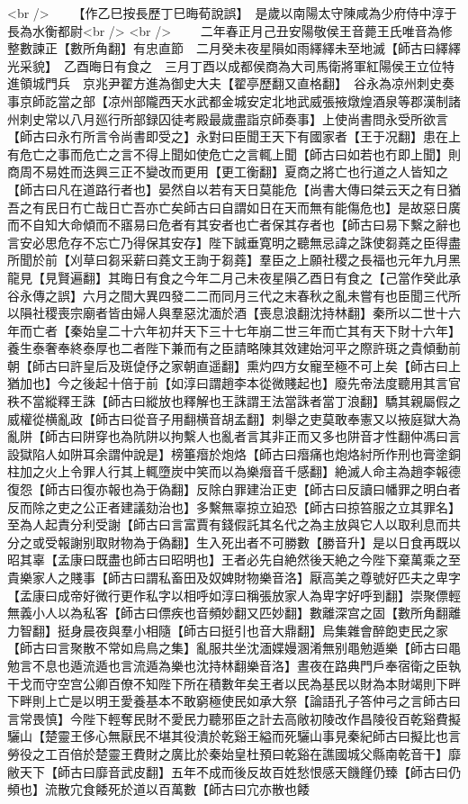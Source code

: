 <br />
　　【作乙巳按長歷丁巳晦荀說誤】　是歲以南陽太守陳咸為少府侍中淳于長為水衡都尉<br />
<br />
　　二年春正月己丑安陽敬侯王音薨王氏唯音為修整數諫正【數所角翻】有忠直節　二月癸未夜星隕如雨繹繹未至地滅【師古曰繹繹光采貌】　乙酉晦日有食之　三月丁酉以成都侯商為大司馬衛將軍紅陽侯王立位特進領城門兵　京兆尹翟方進為御史大夫【翟亭歷翻又直格翻】　谷永為凉州刺史奏事京師訖當之部【凉州部隴西天水武都金城安定北地武威張掖燉煌酒泉等郡漢制諸州刺史常以八月廵行所部録囚徒考殿最歲盡詣京師奏事】上使尚書問永受所欲言【師古曰永冇所言令尚書即受之】永對曰臣聞王天下有國家者【王于况翻】患在上有危亡之事而危亡之言不得上聞如使危亡之言輒上聞【師古曰如若也冇即上聞】則商周不易姓而迭興三正不變改而更用【更工衡翻】夏商之將亡也行道之人皆知之【師古曰凡在道路行者也】晏然自以若有天日莫能危【尚書大傳曰桀云天之有日猶吾之有民日冇亡哉日亡吾亦亡矣師古曰自謂如日在天而無有能傷危也】是故惡日廣而不自知大命傾而不寤易曰危者有其安者也亡者保其存者也【師古曰易下繫之辭也言安必思危存不忘亡乃得保其安存】陛下誠垂寛明之聽無忌諱之誅使芻蕘之臣得盡所聞於前【刈草曰芻采薪曰蕘文王詢于芻蕘】羣臣之上願社稷之長福也元年九月黑龍見【見賢遍翻】其晦日有食之今年二月己未夜星隕乙酉日有食之【己當作癸此承谷永傳之誤】六月之間大異四發二二而同月三代之末春秋之亂未嘗有也臣聞三代所以隕社稷喪宗廟者皆由婦人與羣惡沈湎於酒【喪息浪翻沈持林翻】秦所以二世十六年而亡者【秦始皇二十六年初幷天下三十七年崩二世三年而亡其有天下財十六年】養生泰奢奉終泰厚也二者陛下兼而有之臣請略陳其效建始河平之際許斑之貴傾動前朝【師古曰許皇后及斑偼伃之家朝直遥翻】熏灼四方女寵至極不可上矣【師古曰上猶加也】今之後起十倍于前【如淳曰謂趙李本從微賤起也】廢先帝法度聽用其言官秩不當縱釋王誅【師古曰縱放也釋解也王誅謂王法當誅者當丁浪翻】驕其親屬假之威權從横亂政【師古曰從音子用翻横音胡孟翻】刺舉之吏莫敢奉憲又以掖庭獄大為亂阱【師古曰阱穿也為阬阱以拘繫人也亂者言其非正而又多也阱音才性翻仲馮曰言設獄陷人如阱耳余謂仲說是】榜箠㿊於炮烙【師古曰㿊痛也炮烙紂所作刑也膏塗銅柱加之火上令罪人行其上輒墮炭中笑而以為樂㿊音千感翻】絶滅人命主為趙李報德復怨【師古曰復亦報也為于偽翻】反除白罪建治正吏【師古曰反讀曰幡罪之明白者反而除之吏之公正者建議劾治也】多繫無辜掠立廹恐【師古曰掠笞服之立其罪名】至為人起責分利受謝【師古曰言富賈有錢假託其名代之為主放與它人以取利息而共分之或受報謝别取財物為于偽翻】生入死出者不可勝數【勝音升】是以日食再既以昭其辜【孟康曰既盡也師古曰昭明也】王者必先自絶然後天絶之今陛下棄萬乘之至貴樂家人之賤事【師古曰謂私畜田及奴婢財物樂音洛】厭高美之尊號好匹夫之卑字【孟康曰成帝好微行更作私字以相呼如淳曰稱張放家人為卑字好呼到翻】崇聚僄輕無義小人以為私客【師古曰僄疾也音頻妙翻又匹妙翻】數離深宫之固【數所角翻離力智翻】挺身晨夜與羣小相隨【師古曰挺引也音大鼎翻】烏集雜會醉飽吏民之家【師古曰言聚散不常如烏鳥之集】亂服共坐沈湎媟嫚溷淆無别黽勉遁樂【師古曰黽勉言不息也遁流遁也言流遁為樂也沈持林翻樂音洛】晝夜在路典門戶奉宿衛之臣執干戈而守空宫公卿百僚不知陛下所在積數年矣王者以民為基民以財為本財竭則下畔下畔則上亡是以明王愛養基本不敢窮極使民如承大祭【論語孔子答仲弓之言師古曰言常畏慎】今陛下輕奪民財不愛民力聽邪臣之計去高敞初陵改作昌陵役百乾谿費擬驪山【楚靈王侈心無厭民不堪其役潰於乾谿王縊而死驪山事見秦紀師古曰擬比也言勞役之工百倍於楚靈王費財之廣比於秦始皇杜預曰乾谿在譙國城父縣南乾音干】靡敝天下【師古曰靡音武皮翻】五年不成而後反故百姓愁恨感天饑饉仍臻【師古曰仍頻也】流散宂食餧死於道以百萬數【師古曰宂亦散也餧